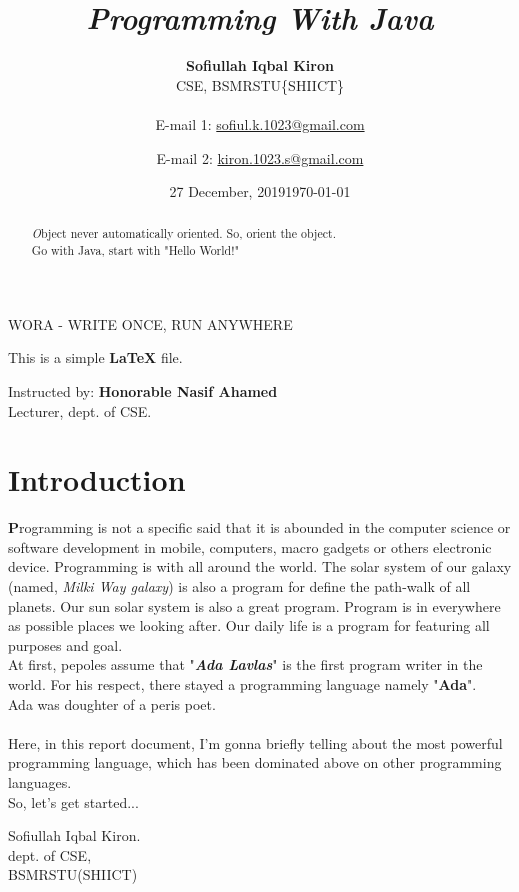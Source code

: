 \documentclass[paper = A5, headinclude, parskip = full, oneside, font = 11 pt]{report}
\title{\textit{\textbf{\emph{P}}rogramming \textbf{\emph{W}}ith \textbf{\emph{J}}ava}}
\author
 {
 	\textbf{Sofiullah Iqbal Kiron}
 	\\
 	CSE, BSMRSTU\{SHIICT\}
 	\\
 	\\
 	E-mail 1: \href{mailto:sofiul.k.1023@gmail.com}{sofiul.k.1023@gmail.com}
 	\and
 	E-mail 2: \href{mailto:kiron.1023.s@gmail.com}{kiron.1023.s@gmail.com}
 }
\date{27 December, 2019}
\begin{document}
\pagecolor{green}

\maketitle
\frenchspacing
{}
\pagestyle{plain}

\pagecolor{white}

\begin{abstract}
\color{blue}
\emph{O}bject never automatically oriented. So, orient the object.\\
Go with Java, start with "Hello World!"
\color{black}
\end{abstract}

\newpage

\pagecolor{black!89}

\begin{center}
 \color{violet}
  WORA - WRITE ONCE, RUN ANYWHERE
 \color{black}
 
 \begin{huge}
 \color{white}
  This is a simple \textbf{\LaTeX{}} file.
 \end{huge}
\end{center}

\begin{center}
\color{brown}
{\LARGE Instructed by: \textbf{Honorable Nasif Ahamed}\\Lecturer, dept. of CSE.}
\end{center}

\newpage

\pagecolor{white}

\color{black}
\section*{Introduction}
\textbf{P}rogramming is not a specific said that it is abounded in the computer science or software development in mobile, computers, macro gadgets or others electronic device. Programming is with all around the world. The solar system of our galaxy (named, \textit{Milki Way galaxy}) is also a program for define the path-walk of all planets. Our sun solar system is also a great program. Program is in everywhere as possible places we looking after. Our daily life is a program for featuring all purposes and goal.
\\

At first, pepoles assume that "\textbf{\textit{Ada Lavlas}}" is the first program writer in the world. For his respect, there stayed a programming language namely "\textbf{Ada}".
\\
Ada was doughter of a peris poet.
\\
\\
Here, in this report document, I'm gonna briefly telling about the most powerful programming language, which has been dominated above on other programming languages.
\\
So, let's get started...
\begin{flushright}
 Sofiullah Iqbal Kiron.
 \\
 dept. of CSE,\\BSMRSTU(SHIICT)
 \\
 \date{\today}
\end{flushright}
\end{document}
